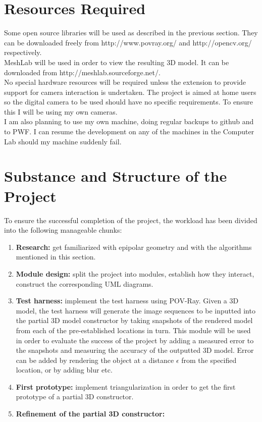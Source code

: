 \section*{Resources Required}
Some open source libraries will be used as described in the previous section. They can be downloaded freely from http://www.povray.org/ and http://opencv.org/ respectively.\\
MeshLab will be used in order to view the resulting 3D model. It can be downloaded from http://meshlab.sourceforge.net/.\\

No special hardware resources will be required unless the extension to provide support for camera interaction is undertaken. The project is aimed at home users so the digital camera to be used should have no specific requirements. To ensure this I will be using my own cameras.\\

I am also planning to use my own machine, doing regular backups to github and to PWF. I can resume the development on any of the machines in the Computer Lab should my machine suddenly fail. 

\section*{Substance and Structure of the Project}
To ensure the successful completion of the project, the workload has been divided into the following manageable chunks:
\begin{enumerate}
\item {\bf Research:} get familiarized with epipolar geometry and with the algorithms mentioned in this section. 
\item {\bf Module design:} split the project into modules, establish how they interact, construct the corresponding UML diagrams. 
\item {\bf Test harness:} implement the test harness using POV-Ray. Given a 3D model, the test harness will generate the image sequences to be inputted into the partial 3D model constructor by taking snapshots of the rendered model from each of the pre-established locations in turn. This module will be used in order to evaluate the success of the project by adding a measured error to the snapshots and measuring the accuracy of the outputted 3D model. Error can be added by rendering the object at a distance $\epsilon$ from the specified location, or by adding blur etc.
\item {\bf First prototype:} implement triangularization in order to get the first prototype of a partial 3D constructor.
\item {\bf Refinement of the partial 3D constructor:}    
\end{enumerate}


